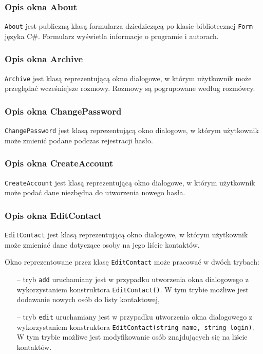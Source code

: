 \documentclass[a4paper,12pt]{article}
\begin{document}
\subsubsection[Opis okna About]{Opis okna About}
\texttt{About} jest publiczną klasą formularza dziedziczącą po klasie bibliotecznej \texttt{Form} języka C\#. Formularz wyświetla informacje o programie i autorach.

\subsubsection[Opis okna Archive]{Opis okna Archive}
\texttt{Archive} jest klasą reprezentującą okno dialogowe, w którym użytkownik może przeglądać wcześniejsze rozmowy. Rozmowy są pogrupowane według rozmówcy.

\subsubsection[Opis okna ChangePassword]{Opis okna ChangePassword}
\texttt{ChangePassword} jest klasą reprezentującą okno dialogowe, w którym użytkownik może zmienić podane podczas rejestracji hasło. 

\subsubsection[Opis okna CreateAccount]{Opis okna CreateAccount}
\texttt{CreateAccount} jest klasą reprezentującą okno dialogowe, w którym użytkownik może podać dane niezbędna do utworzenia nowego hasła.

\subsubsection[Opis okna EditContact]{Opis okna EditContact}
\texttt{EditContact} jest klasą reprezentującą okno dialogowe, w którym użytkownik może zmieniać dane dotyczące osoby na jego liście kontaktów.\newline 

\noindent Okno reprezentowane przez klasę \texttt{EditContact} może pracować w dwóch trybach:

\begin{itemize}
    \item[--] tryb \texttt{add} uruchamiany jest w przypadku utworzenia okna dialogowego z wykorzystaniem konstruktora \texttt{EditContact()}. W tym trybie możliwe jest dodawanie nowych osób do listy kontaktowej,
    \item[--] tryb \texttt{edit} uruchamiany jest w przypadku utworzenia okna dialogowego z wykorzystaniem konstruktora \texttt{EditContact(string name, string login)}. W tym trybie możliwe jest modyfikowanie osób znajdujących się na liście kontaktów.
\end{itemize}
\end{document}
